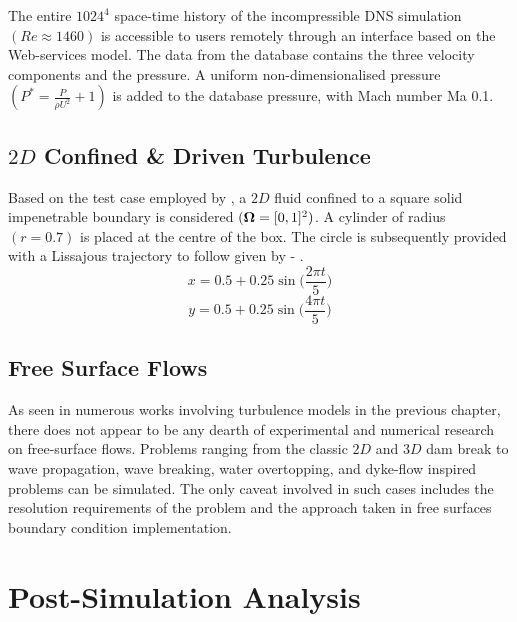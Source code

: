 The entire $1024^4$ space-time history of the incompressible DNS simulation $(Re\approx1460)$ is accessible to users remotely through an interface based on the Web-services model. 
The data from the database contains the three velocity components and the pressure. A uniform non-dimensionalised pressure $(P^* = \frac{P}{\rho U^2} + 1)$ is added to the
database pressure, with Mach number Ma 0.1. 

\subsection[2D Confined and Driven Turbulence]{$2D$ Confined \& Driven Turbulence}
Based on the test case employed by \cite{Monaghan2017}, a $2D$ fluid confined to a square solid impenetrable boundary is considered $(\bm{\Omega} = [0,1]^2)$. A cylinder of radius $(r=0.7)$ is placed at the centre of the box. The circle is subsequently provided with a Lissajous trajectory to follow given by  - .
\begin{equation}
    x = 0.5 + 0.25 \sin \bigg( \frac{2\pi t}{5} \bigg)
    \label{eq:2d-cdt-x}
\end{equation}
\begin{equation}
    y = 0.5 + 0.25 \sin \bigg( \frac{4\pi t}{5} \bigg)
    \label{eq:2d-cdt-y}
\end{equation}

\subsection{Free Surface Flows}
As seen in numerous works involving turbulence models in the previous chapter, there does not appear to be any dearth of experimental and numerical research on free-surface flows. Problems ranging from the classic $2D$ and $3D$ dam break to wave propagation, wave breaking, water overtopping, and dyke-flow inspired problems can be simulated. The only caveat involved in such cases includes the resolution requirements of the problem and the approach taken in free surfaces boundary condition implementation.

\section{Post-Simulation Analysis}
